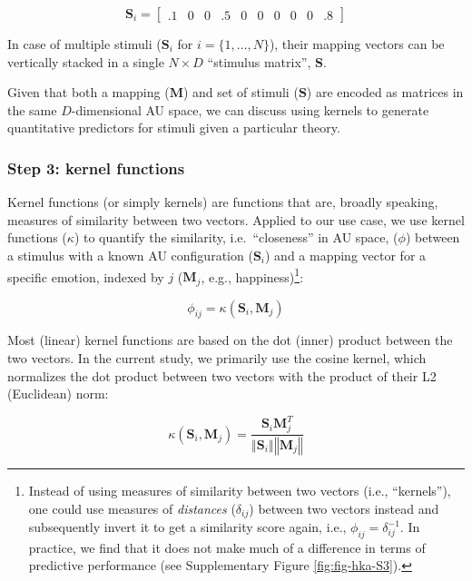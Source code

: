\documentclass[12pt,american,a4paper,oneside,]{memoir} %
\let\rmarkdownfootnote\footnote%
\def\footnote{\protect\rmarkdownfootnote}
\begin{document}
\begin{equation}
\mathbf{S}_{i} = \begin{bmatrix} .1 & 0 & 0 & .5 & 0 & 0 & 0 & 0 & 0 & .8 \end{bmatrix}
\end{equation}

In case of multiple stimuli (\(\mathbf{S}_{i}\) for \(i = \{1, \dots, N\}\)), their mapping vectors can be vertically stacked in a single \(N \times D\) ``stimulus matrix'', \(\mathbf{S}\).

Given that both a mapping (\(\mathbf{M}\)) and set of stimuli (\(\mathbf{S}\)) are encoded as matrices in the same \(D\)-dimensional AU space, we can discuss using kernels to generate quantitative predictors for stimuli given a particular theory.

\hypertarget{step-3-kernel-functions}{%
\subsubsection{Step 3: kernel functions}\label{step-3-kernel-functions}}

Kernel functions (or simply kernels) are functions that are, broadly speaking, measures of similarity between two vectors. Applied to our use case, we use kernel functions (\(\kappa\)) to quantify the similarity, i.e.~``closeness'' in AU space, (\(\phi\)) between a stimulus with a known AU configuration (\(\mathbf{S}_{i}\)) and a mapping vector for a specific emotion, indexed by \(j\) (\(\mathbf{M}_{j}\), e.g., happiness)\footnote{Instead of using measures of similarity between two vectors (i.e., ``kernels''), one could use measures of \emph{distances} (\(\delta_{ij}\)) between two vectors instead and subsequently invert it to get a similarity score again, i.e., \(\phi_{ij} = \delta_{ij}^{-1}\). In practice, we find that it does not make much of a difference in terms of predictive performance (see Supplementary Figure \ref{fig:fig-hka-S3}).}:

\begin{equation}
\phi_{ij} = \kappa(\mathbf{S}_{i}, \mathbf{M}_{j})
\end{equation}

Most (linear) kernel functions are based on the dot (inner) product between the two vectors. In the current study, we primarily use the cosine kernel, which normalizes the dot product between two vectors with the product of their L2 (Euclidean) norm:

\begin{equation}
\kappa(\mathbf{S}_{i}, \mathbf{M}_{j}) = \frac{\mathbf{S}_{i}\mathbf{M}_{j}^{T}}{\left\Vert \mathbf{S}_{i} \right\Vert \left\Vert \mathbf{M}_{j} \right\Vert}
\end{equation}
\end{document}

